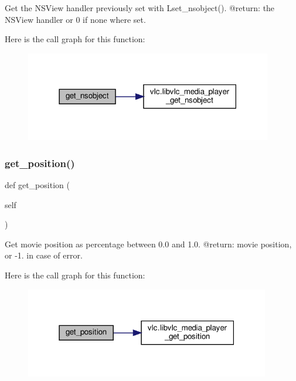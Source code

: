 \begin{DoxyVerb}Get the NSView handler previously set with L{set_nsobject}().
@return: the NSView handler or 0 if none where set.
\end{DoxyVerb}
 Here is the call graph for this function\+:
\nopagebreak
\begin{figure}[H]
\begin{center}
\leavevmode
\includegraphics[width=306pt]{classvlc_1_1_media_player_aa4c7fba6bb178e5df3d8ff9262fd9e86_cgraph}
\end{center}
\end{figure}
\mbox{\label{classvlc_1_1_media_player_a17e5bc839e5dae9b73b8454fed5c216c}} 
\subsubsection{\texorpdfstring{get\+\_\+position()}{get\_position()}}
{\footnotesize\ttfamily def get\+\_\+position (\begin{DoxyParamCaption}\item[{}]{self }\end{DoxyParamCaption})}

\begin{DoxyVerb}Get movie position as percentage between 0.0 and 1.0.
@return: movie position, or -1. in case of error.
\end{DoxyVerb}
 Here is the call graph for this function\+:
\nopagebreak
\begin{figure}[H]
\begin{center}
\leavevmode
\includegraphics[width=303pt]{classvlc_1_1_media_player_a17e5bc839e5dae9b73b8454fed5c216c_cgraph}
\end{center}
\end{figure}
\mbox{\label{classvlc_1_1_media_player_ad1385ad1f285068608d077b325909d30}} 
